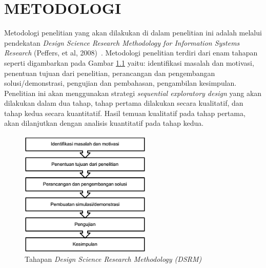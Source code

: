 \chapter{METODOLOGI}
Metodologi penelitian yang akan dilakukan di dalam penelitian ini adalah melalui pendekatan \textit{Design Science Research Methodology for Information Systems Research} (Peffers, et al, 2008)~\cite{geerts_design_2011}. Metodologi penelitian terdiri dari enam tahapan seperti digambarkan pada Gambar \ref{fig:dsrm} yaitu: identifikasi masalah dan motivasi, penentuan tujuan dari penelitian, perancangan dan pengembangan solusi/demonstrasi, pengujian dan pembahasan, pengambilan kesimpulan. Penelitian ini akan menggunakan strategi \textit{sequential exploratory design} yang akan dilakukan dalam dua tahap, tahap pertama dilakukan secara kualitatif, dan tahap kedua secara kuantitatif. Hasil temuan kualitatif pada tahap pertama, akan dilanjutkan dengan analisis kuantitatif pada tahap kedua.

\begin{figure}[H]
    \centering
    \includegraphics[height=6cm]{images/dsrm}
    \caption{Tahapan \textit{Design Science Research Methodology (DSRM)}}
    \label{fig:dsrm}
\end{figure}

